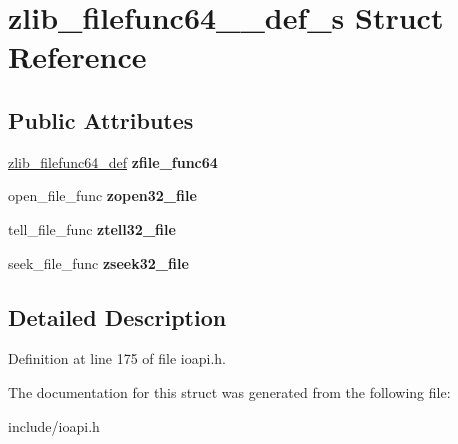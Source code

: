 \hypertarget{structzlib__filefunc64__32__def__s}{\section{zlib\-\_\-filefunc64\-\_\-\_\-def\-\_\-s Struct Reference}
\label{structzlib__filefunc64__32__def__s}
}
\subsection*{Public Attributes}
\begin{DoxyCompactItemize}
\item 
\hypertarget{structzlib__filefunc64__32__def__s_a5b05687723a1a8cd310a73ab62fc31f5}{\hyperlink{structzlib__filefunc64__def__s}{zlib\-\_\-filefunc64\-\_\-def} {\bfseries zfile\-\_\-func64}}\label{structzlib__filefunc64__32__def__s_a5b05687723a1a8cd310a73ab62fc31f5}

\item 
\hypertarget{structzlib__filefunc64__32__def__s_a784a1cead2df16b1ce5881f32236308a}{open\-\_\-file\-\_\-func {\bfseries zopen32\-\_\-file}}\label{structzlib__filefunc64__32__def__s_a784a1cead2df16b1ce5881f32236308a}

\item 
\hypertarget{structzlib__filefunc64__32__def__s_a8ef46da9e69697b4f13cd611523761a8}{tell\-\_\-file\-\_\-func {\bfseries ztell32\-\_\-file}}\label{structzlib__filefunc64__32__def__s_a8ef46da9e69697b4f13cd611523761a8}

\item 
\hypertarget{structzlib__filefunc64__32__def__s_a2c6e18405ec9c8b2d482055e9bf06766}{seek\-\_\-file\-\_\-func {\bfseries zseek32\-\_\-file}}\label{structzlib__filefunc64__32__def__s_a2c6e18405ec9c8b2d482055e9bf06766}

\end{DoxyCompactItemize}


\subsection{Detailed Description}


Definition at line 175 of file ioapi.\-h.



The documentation for this struct was generated from the following file\-:\begin{DoxyCompactItemize}
\item 
include/ioapi.\-h\end{DoxyCompactItemize}
